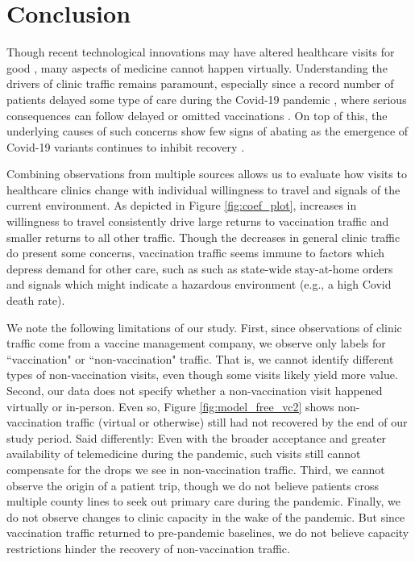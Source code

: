 \section{Conclusion} \label{Conclusion_VC2}
 Though recent technological innovations may have altered healthcare visits for good \citep{WSJ_checkup}, many aspects of medicine cannot happen virtually. Understanding the drivers of clinic traffic remains paramount, especially since a record number of patients delayed some type of care during the Covid-19 pandemic \citep{Findling2020}, where serious consequences can follow delayed or omitted vaccinations \citep{Salmon2015}. On top of this, the underlying causes of such concerns show few signs of abating as the emergence of Covid-19 variants continues to inhibit recovery \citep{WSJ_delta}.
 
 Combining observations from multiple sources allows us to evaluate how visits to healthcare clinics change with individual willingness to travel and signals of the current environment. As depicted in Figure \ref{fig:coef_plot}, increases in willingness to travel consistently drive large returns to vaccination traffic and smaller returns to all other traffic. Though the decreases in general clinic traffic do present some concerns, vaccination traffic seems immune to factors which depress demand for other care, such as such as state-wide stay-at-home orders and signals which might indicate a hazardous environment (e.g., a high Covid death rate). 
 
 We note the following limitations of our study. First, since observations of clinic traffic come from a vaccine management company, we observe only labels for “vaccination" or “non-vaccination" traffic. That is, we cannot identify different types of non-vaccination visits, even though some visits likely yield more value. Second, our data does not specify whether a non-vaccination visit happened virtually or in-person. Even so, Figure \ref{fig:model_free_vc2} shows non-vaccination traffic (virtual or otherwise) still had not recovered by the end of our study period. Said differently: Even with the broader acceptance and greater availability of telemedicine during the pandemic, such visits still cannot compensate for the drops we see in non-vaccination traffic. Third, we cannot observe the origin of a patient trip, though we do not believe patients cross multiple county lines to seek out primary care during the pandemic. Finally, we do not observe changes to clinic capacity in the wake of the pandemic. But since vaccination traffic returned to pre-pandemic baselines, we do not believe capacity restrictions hinder the recovery of non-vaccination traffic.
 
